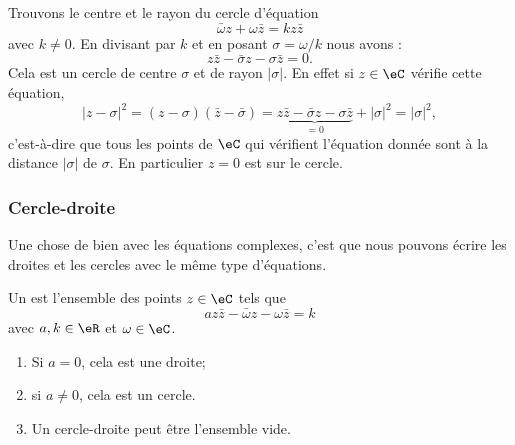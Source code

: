 \begin{example}
	Trouvons le centre et le rayon du cercle d'équation
	\begin{equation}
		\bar\omega z+\omega\bar z=kz\bar z
	\end{equation}
	avec \( k\neq 0\). En divisant par \( k\) et en posant \( \sigma=\omega/k\) nous avons :
	\begin{equation}
		z\bar z-\bar\sigma z-\sigma\bar z=0.
	\end{equation}
	Cela est un cercle de centre \( \sigma\) et de rayon \( | \sigma |\). En effet si \( z\in \eC\) vérifie cette équation,
	\begin{equation}
		| z-\sigma |^2=(z-\sigma)(\bar z-\bar \sigma)=\underbrace{z\bar z-\bar \sigma z-\sigma \bar z}_{=0}+| \sigma |^2=| \sigma |^2,
	\end{equation}
	c'est-à-dire que tous les points de \( \eC\) qui vérifient l'équation donnée sont à la distance \( | \sigma |\) de \( \sigma\). En particulier \( z=0\) est sur le cercle.
\end{example}

\subsubsection{Cercle-droite}

Une chose de bien avec les équations complexes, c'est que nous pouvons écrire les droites et les cercles avec le même type d'équations.

\begin{lemmaDef}     \label{LEMooHKHOooHpBuBZ}
	Un  est l'ensemble des points \( z\in \eC\) tels que
	\begin{equation}        \label{EQooUJAKooEVQNqa}
		az\bar z-\bar\omega z-\omega\bar z=k
	\end{equation}
	avec \( a,k\in \eR\) et \( \omega\in \eC\).
	\begin{enumerate}
		\item
		      Si \( a=0\), cela est une droite;
		\item
		      si \( a\neq 0\), cela est un cercle.
		\item
		      Un cercle-droite peut être l'ensemble vide.
	\end{enumerate}
\end{lemmaDef}

